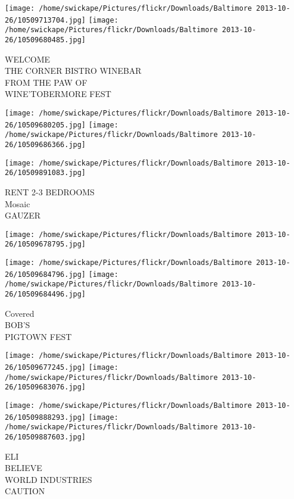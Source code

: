 \documentclass[10pt,letterpaper]{article}
\begin{document}
\texttt{[image: /home/swickape/Pictures/flickr/Downloads/Baltimore 2013-10-26/10509713704.jpg]}
\texttt{[image: /home/swickape/Pictures/flickr/Downloads/Baltimore 2013-10-26/10509680485.jpg]}

WELCOME\\
THE CORNER BISTRO WINEBAR\\
FROM THE PAW OF\\
WINE'TOBERMORE FEST\\
\pagebreak

\texttt{[image: /home/swickape/Pictures/flickr/Downloads/Baltimore 2013-10-26/10509680205.jpg]}
\texttt{[image: /home/swickape/Pictures/flickr/Downloads/Baltimore 2013-10-26/10509686366.jpg]}

\texttt{[image: /home/swickape/Pictures/flickr/Downloads/Baltimore 2013-10-26/10509891083.jpg]}

RENT 2{-}3 BEDROOMS\\
Mosaic\\
GAUZER\\
\pagebreak

\texttt{[image: /home/swickape/Pictures/flickr/Downloads/Baltimore 2013-10-26/10509678795.jpg]}

\vspace{0.25in}
\texttt{[image: /home/swickape/Pictures/flickr/Downloads/Baltimore 2013-10-26/10509684796.jpg]}
\texttt{[image: /home/swickape/Pictures/flickr/Downloads/Baltimore 2013-10-26/10509684496.jpg]}

Covered\\
BOB'S\\
PIGTOWN FEST\\
\pagebreak

\texttt{[image: /home/swickape/Pictures/flickr/Downloads/Baltimore 2013-10-26/10509677245.jpg]}
\texttt{[image: /home/swickape/Pictures/flickr/Downloads/Baltimore 2013-10-26/10509683076.jpg]}

\texttt{[image: /home/swickape/Pictures/flickr/Downloads/Baltimore 2013-10-26/10509888293.jpg]}
\texttt{[image: /home/swickape/Pictures/flickr/Downloads/Baltimore 2013-10-26/10509887603.jpg]}

ELI\\
BELIEVE\\
WORLD INDUSTRIES\\
CAUTION\\
\pagebreak
\end{document}
